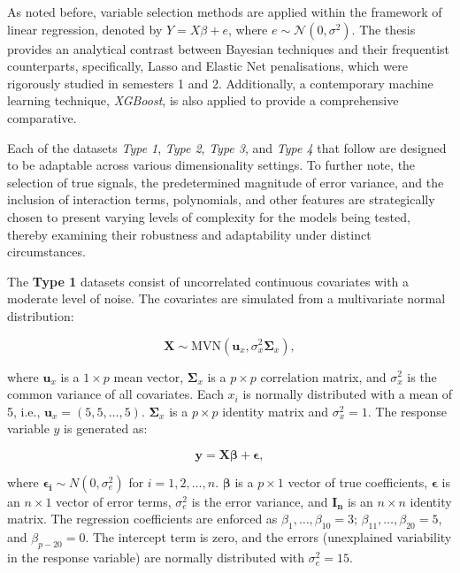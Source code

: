\documentclass[
  11pt,
]{article}
\begin{document}
As noted before, variable selection methods are applied within the
framework of linear regression, denoted by \(Y = X\beta + e\), where
\(e \sim \mathcal{N}(0, \sigma^2)\). The thesis provides an analytical
contrast between Bayesian techniques and their frequentist counterparts,
specifically, Lasso and Elastic Net penalisations, which were rigorously
studied in semesters 1 and 2. Additionally, a contemporary machine
learning technique, \emph{XGBoost}, is also applied to provide a
comprehensive comparative.

Each of the datasets \emph{Type 1}, \emph{Type 2}, \emph{Type 3}, and
\emph{Type 4} that follow are designed to be adaptable across various
dimensionality settings. To further note, the selection of true signals,
the predetermined magnitude of error variance, and the inclusion of
interaction terms, polynomials, and other features are strategically
chosen to present varying levels of complexity for the models being
tested, thereby examining their robustness and adaptability under
distinct circumstances.

\hfill\break

The \textbf{Type 1} datasets consist of uncorrelated continuous
covariates with a moderate level of noise. The covariates are simulated
from a multivariate normal distribution:

\begin{equation}
\mathbf{X} \sim \text{MVN}(\mathbf{u}_x, \sigma_x^2 \mathbf{\Sigma}_x),
\end{equation}

where \(\mathbf{u}_x\) is a \(1 \times p\) mean vector,
\(\mathbf{\Sigma}_x\) is a \(p \times p\) correlation matrix, and
\(\sigma_x^2\) is the common variance of all covariates. Each \(x_i\) is
normally distributed with a mean of 5, i.e.,
\(\mathbf{u}_x = (5, 5, \ldots, 5)\). \(\mathbf{\Sigma}_x\) is a
\(p \times p\) identity matrix and \(\sigma_x^2 = 1\). The response
variable \(y\) is generated as:

\begin{equation}
\mathbf{y} = \mathbf{X}\boldsymbol{\beta} + \boldsymbol{\epsilon},
\end{equation}

where \(\boldsymbol{\epsilon_i} \sim N(0, \sigma_e^2)\) for
\(i = 1, 2, \ldots, n\). \(\boldsymbol{\beta}\) is a \(p \times 1\)
vector of true coefficients, \(\boldsymbol{\epsilon}\) is an
\(n \times 1\) vector of error terms, \(\sigma_e^2\) is the error
variance, and \(\mathbf{I_n}\) is an \(n \times n\) identity matrix. The
regression coefficients are enforced as
\(\beta_1, \ldots, \beta_{10} = 3\);
\(\beta_{11}, \ldots, \beta_{20} = 5\), and \(\beta_{p-20} = 0\). The
intercept term is zero, and the errors (unexplained variability in the
response variable) are normally distributed with \(\sigma_e^2 = 15\).
\end{document}
